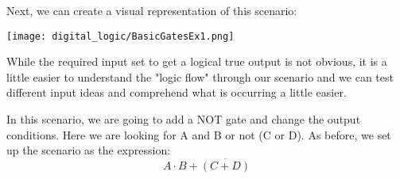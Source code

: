 \begin{example}
        Next, we can create a visual representation of this scenario:
        \begin{center}
            \texttt{[image: digital\_logic/BasicGatesEx1.png]}
        \end{center}

        While the required input set to get a logical true output is not obvious, it is a little easier to understand the "logic flow" through our scenario and we can test different input ideas and comprehend what is occurring a little easier.

    \end{example}

    \begin{example} \label{ex:basic-logic-gates-2}
        In this scenario, we are going to add a NOT gate and change the output conditions.
        Here we are looking for A and B or not (C or D).
        As before, we set up the scenario as the expression:
        \begin{equation*}
            A \cdot B + \overline{(C + D)}
        \end{equation*}


\end{example}
